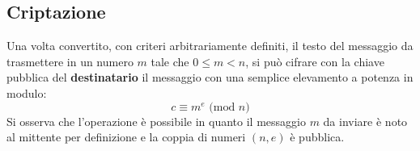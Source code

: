 \subsection{Criptazione}
Una volta convertito, con criteri arbitrariamente definiti, il testo del messaggio da trasmettere in un numero $m$ tale che $0 \leq m < n$, si può cifrare con la chiave pubblica del \textbf{destinatario} il messaggio con una semplice elevamento a potenza in modulo:
\begin{equation}\label{cifratura}
    c \equiv m^e \text{ (mod $n$)}
\end{equation}
Si osserva che l'operazione è possibile in quanto il messaggio $m$ da inviare è noto al mittente per definizione e la coppia di numeri $(n,e)$ è pubblica.
